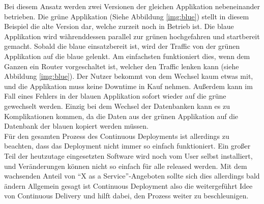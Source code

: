 Bei diesem Ansatz werden zwei Versionen der gleichen Applikation nebeneinander betrieben. Die grüne Applikation (Siehe Abbildung \ref{img:blue}) stellt in diesem Beispiel die alte Version dar, welche zurzeit noch in Betrieb ist. Die blaue Applikation wird währenddessen parallel zur grünen hochgefahren und startbereit gemacht. Sobald die blaue einsatzbereit ist, wird der Traffic von der grünen Applikation auf die blaue gelenkt. Am einfachsten funktioniert dies, wenn dem Ganzen ein Router vorgeschaltet ist, welcher den Traffic lenken kann (siehe Abbildung \ref{img:blue}).\autocite[Vgl.][S.407]{Farley.2010} Der Nutzer bekommt von dem Wechsel kaum etwas mit, und die Applikation muss keine Downtime in Kauf nehmen. Außerdem kann im Fall eines Fehlers in der blauen Applikation sofort wieder auf die grüne gewechselt werden. Einzig bei dem Wechsel der Datenbanken kann es zu Komplikationen kommen, da die Daten aus der grünen Applikation auf die Datenbank der blauen kopiert werden müssen.\autocite[Vgl.][S.407]{Farley.2010}\\  
Für den gesamten Prozess des Continuous Deployments ist allerdings zu beachten, dass das Deployment nicht immer so einfach funktioniert. Ein großer Teil der heutzutage eingesetzten Software wird noch vom User selbst installiert, und Veränderungen können nicht so einfach für alle released werden. Mit dem wachsenden Anteil von \enquote{X as a Service}-Angeboten\autocite[S.18]{Stahl.2018} sollte sich dies allerdings bald ändern\autocite[Vgl.][S.18]{Stahl.2018} Allgemein gesagt ist Continuous Deployment also die weitergeführt Idee von Continuous Delivery und hilft dabei, den Prozess weiter zu beschleunigen.
